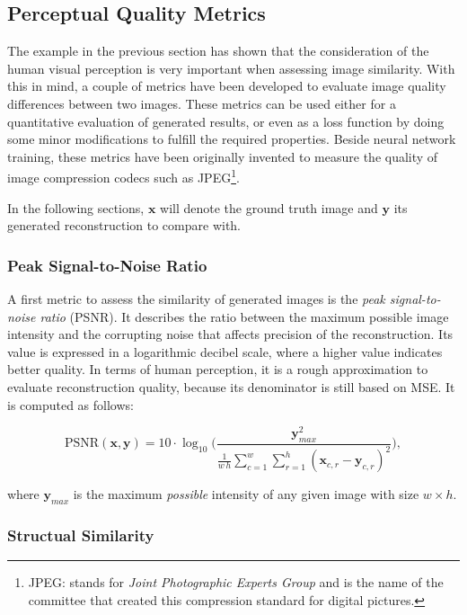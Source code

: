 \subsection{Perceptual Quality Metrics}

The example in the previous section has shown that the consideration of the human visual perception is very important when assessing image similarity. With this in mind, a couple of metrics have been developed to evaluate image quality differences between two images. These metrics can be used either for a quantitative evaluation of generated results, or even as a loss function by doing some minor modifications to fulfill the required properties. Beside neural network training, these metrics have been originally invented to measure the quality of image compression codecs such as JPEG\footnote{JPEG: stands for \textit{Joint Photographic Experts Group} and is the name of the committee that created this compression standard for digital pictures.}.

In the following sections, $ \textbf{x} $ will denote the ground truth image and $ \textbf{y} $ its generated reconstruction to compare with.

\subsubsection*{Peak Signal-to-Noise Ratio}

A first metric to assess the similarity of generated images is the \textit{peak signal-to-noise ratio} (PSNR). It describes the ratio between the maximum possible image intensity and the corrupting noise that affects precision of the reconstruction. Its value is expressed in a logarithmic decibel scale, where a higher value indicates better quality. In terms of human perception, it is a rough approximation to evaluate reconstruction quality, because its denominator is still based on MSE. It is computed as follows:

\begin{equation} \label{eq:psnr}
\textrm{PSNR}(\textbf{x}, \textbf{y}) = 10 \cdot \log_{10} \Bigg( \frac{\textbf{y}_{max}^2}{\frac{1}{w \, h} \sum_{c=1}^{w} \sum_{r=1}^{h} (\textbf{x}_{c,r} - \textbf{y}_{c,r})^2 } \Bigg) ,
\end{equation}

where $ \textbf{y}_{max} $ is the maximum \textit{possible} intensity of any given image with size $ w \times h $.


\subsubsection*{Structual Similarity}

